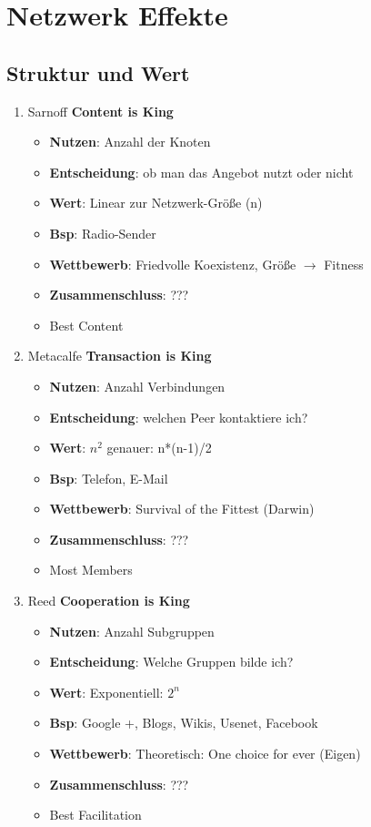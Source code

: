 \documentclass{article} %
\begin{document}
	
	\section{Netzwerk Effekte}	
	\subsection{Struktur und Wert}
	\begin{enumerate}
		\item Sarnoff \textbf{Content is King}
		\begin{itemize}
			\item \textbf{Nutzen}: Anzahl der Knoten
			\item \textbf{Entscheidung}: ob man das Angebot nutzt oder nicht
			\item \textbf{Wert}: Linear zur Netzwerk-Größe (n)
			\item \textbf{Bsp}: Radio-Sender
			\item \textbf{Wettbewerb}: Friedvolle Koexistenz, Größe $\rightarrow$ Fitness
			\item \textbf{Zusammenschluss}: ??? %
			\item Best Content
		\end{itemize}
		\item Metacalfe \textbf{Transaction is King}
		\begin{itemize}
			\item \textbf{Nutzen}: Anzahl Verbindungen
			\item \textbf{Entscheidung}: welchen Peer kontaktiere ich?
			\item \textbf{Wert}: $n^2$ genauer: n*(n-1)/2
			\item \textbf{Bsp}: Telefon, E-Mail
			\item \textbf{Wettbewerb}: Survival of the Fittest (Darwin)
			\item \textbf{Zusammenschluss}: ??? %
			\item Most Members
		\end{itemize}
		\item Reed \textbf{Cooperation is King}
		\begin{itemize}
			\item \textbf{Nutzen}: Anzahl Subgruppen
			\item \textbf{Entscheidung}: Welche Gruppen bilde ich?
			\item \textbf{Wert}: Exponentiell: $2^n$
			\item \textbf{Bsp}: Google +, Blogs, Wikis, Usenet, Facebook
			\item \textbf{Wettbewerb}: Theoretisch: One choice for ever (Eigen)
			\item \textbf{Zusammenschluss}: ???%
			\item Best Facilitation
		\end{itemize}
	\end{enumerate}
\end{document}
